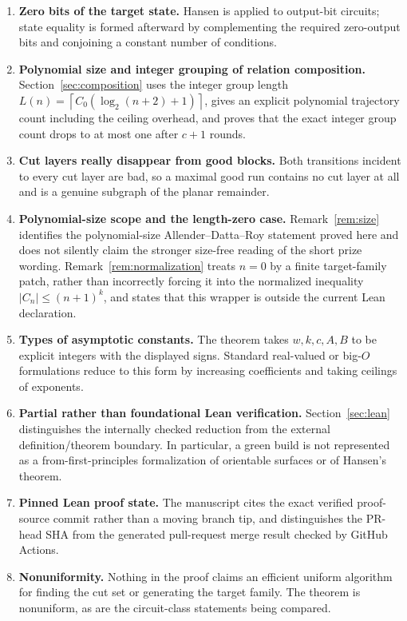 \documentclass[11pt]{article}
\theoremstyle{definition}
\newcommand{\ceil}[1]{\left\lceil #1\right\rceil}
\begin{document}
\begin{enumerate}[leftmargin=2.2em]
  \item \textbf{Zero bits of the target state.}
  Hansen is applied to output-bit circuits; state equality is formed afterward
  by complementing the required zero-output bits and conjoining a constant
  number of conditions.

  \item \textbf{Polynomial size and integer grouping of relation composition.}
  Section~\ref{sec:composition} uses the integer group length
  $L(n)=\ceil{C_0(\log_2(n+2)+1)}$, gives an explicit polynomial trajectory
  count including the ceiling overhead, and proves that the exact integer
  group count drops to at most one after $c+1$ rounds.

  \item \textbf{Cut layers really disappear from good blocks.}
  Both transitions incident to every cut layer are bad, so a maximal good run
  contains no cut layer at all and is a genuine subgraph of the planar
  remainder.

  \item \textbf{Polynomial-size scope and the length-zero case.}
  Remark~\ref{rem:size} identifies the polynomial-size Allender--Datta--Roy
  statement proved here and does not silently claim the stronger size-free
  reading of the short prize wording.  Remark~\ref{rem:normalization} treats
  $n=0$ by a finite target-family patch, rather than incorrectly forcing it
  into the normalized inequality $|C_n|\le(n+1)^k$, and states that this wrapper
  is outside the current Lean declaration.

  \item \textbf{Types of asymptotic constants.}
  The theorem takes $w,k,c,A,B$ to be explicit integers with the displayed
  signs.  Standard real-valued or big-$O$ formulations reduce to this form by
  increasing coefficients and taking ceilings of exponents.

  \item \textbf{Partial rather than foundational Lean verification.}
  Section~\ref{sec:lean} distinguishes the internally checked reduction from
  the external definition/theorem boundary.  In particular, a green build is
  not represented as a from-first-principles formalization of orientable
  surfaces or of Hansen's theorem.

  \item \textbf{Pinned Lean proof state.}
  The manuscript cites the exact verified proof-source commit rather than a
  moving branch tip, and distinguishes the PR-head SHA from the generated
  pull-request merge result checked by GitHub Actions.

  \item \textbf{Nonuniformity.}
  Nothing in the proof claims an efficient uniform algorithm for finding the
  cut set or generating the target family.  The theorem is nonuniform, as are
  the circuit-class statements being compared.
\end{enumerate}
\end{document}
